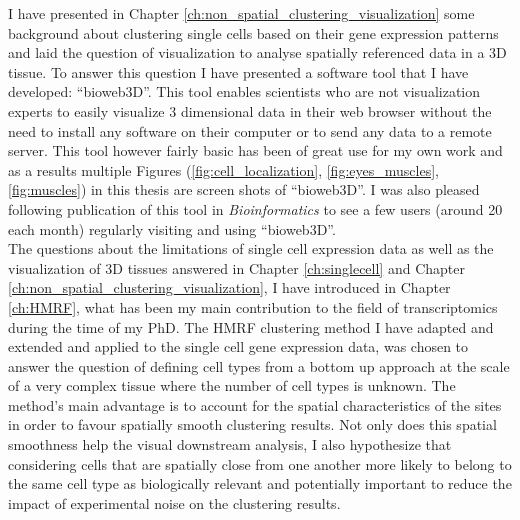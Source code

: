 I have presented in Chapter \ref{ch:non_spatial_clustering_visualization} some background about clustering single cells based on their gene expression patterns and laid the question of visualization to analyse spatially referenced data in a 3D tissue. To answer this question I have presented a software tool that I have developed: ``bioweb3D''. This tool enables scientists who are not visualization experts to easily visualize 3 dimensional data in their web browser without the need to install any software on their computer or to send any data to a remote server. This tool however fairly basic has been of great use for my own work and as a results multiple Figures (\ref{fig:cell_localization}, \ref{fig:eyes_muscles}, \ref{fig:muscles}) in this thesis are screen shots of ``bioweb3D''. I was also pleased following publication of this tool in \emph{Bioinformatics} \cite{Pettit13} to see a few users (around 20 each month) regularly visiting and using ``bioweb3D''.\\

The questions about the limitations of single cell expression data as well as the visualization of 3D tissues answered in Chapter \ref{ch:singlecell} and Chapter \ref{ch:non_spatial_clustering_visualization}, I have introduced in Chapter \ref{ch:HMRF}, what has been my main contribution to the field of transcriptomics during the time of my PhD. The HMRF clustering method I have adapted and extended and applied to the single cell gene expression data, was chosen to answer the question of defining cell types from a bottom up approach at the scale of a very complex tissue where the number of cell types is unknown. The method's main advantage is to account for the spatial characteristics of the sites in order to favour spatially smooth clustering results. Not only does this spatial smoothness help the visual downstream analysis, I also hypothesize that considering cells that are spatially close from one another more likely to belong to the same cell type as biologically relevant and potentially important to reduce the impact of experimental noise on the clustering results.\\

